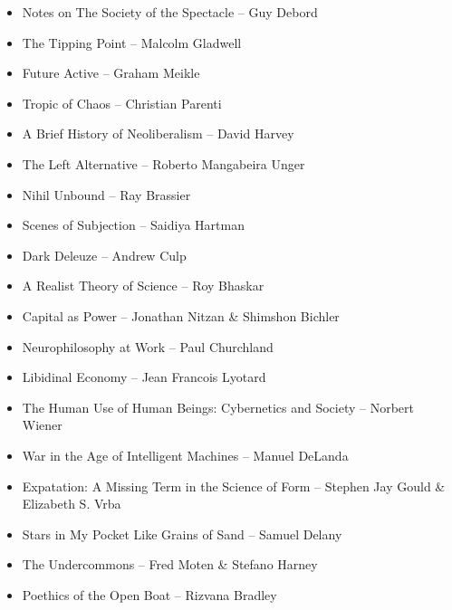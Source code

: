 \documentclass[
]{article}
\begin{document}
\begin{itemize}
\item
  Notes on The Society of the Spectacle -- Guy Debord
\item
  The Tipping Point -- Malcolm Gladwell
\item
  Future Active -- Graham Meikle
\item
  Tropic of Chaos -- Christian Parenti
\item
  A Brief History of Neoliberalism -- David Harvey
\item
  The Left Alternative -- Roberto Mangabeira Unger
\item
  Nihil Unbound -- Ray Brassier
\item
  Scenes of Subjection -- Saidiya Hartman
\item
  Dark Deleuze -- Andrew Culp
\item
  A Realist Theory of Science -- Roy Bhaskar
\item
  Capital as Power -- Jonathan Nitzan \& Shimshon Bichler
\item
  Neurophilosophy at Work -- Paul Churchland
\item
  Libidinal Economy -- Jean Francois Lyotard
\item
  The Human Use of Human Beings: Cybernetics and Society -- Norbert
  Wiener
\item
  War in the Age of Intelligent Machines -- Manuel DeLanda
\item
  Expatation: A Missing Term in the Science of Form -- Stephen Jay Gould
  \& Elizabeth S. Vrba
\item
  Stars in My Pocket Like Grains of Sand -- Samuel Delany
\item
  The Undercommons -- Fred Moten \& Stefano Harney
\item
  Poethics of the Open Boat -- Rizvana Bradley
\end{itemize}
\end{document}
